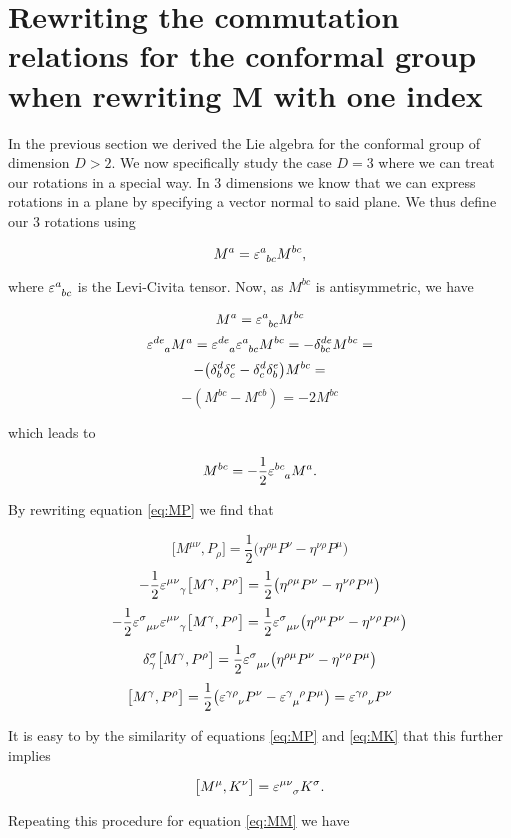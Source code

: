 \section{Rewriting the commutation relations for the conformal group when rewriting M with one index}

In the previous section we derived the Lie algebra for the conformal group of dimension $D>2$. We now specifically study the case $D=3$ where we can treat our rotations in a special way. In 3 dimensions we know that we can express rotations in a plane by specifying a vector normal to said plane. We thus define our 3 rotations using

    $$
    M^a=\ep\ein{a}{bc}M^{bc},
    $$

where $\ep \ein{a}{bc}$ is the Levi-Civita tensor. Now, as $M^{bc}$ is antisymmetric, we have

    $$
    M^a=\ep\ein{a}{bc}M^{bc} 
    $$$$
    \ep \ein{de}{a} M^a=\ep \ein{de}{a} \ep\ein{a}{bc} M^{bc}=-\de^{de}_{bc} M^{bc}=
    $$$$
    -\big( \delta^{d}_{b}\delta^{e}_{c}-\delta^{d}_{c} \delta^{e}_{b} \big) M^{bc}=
    $$$$
    -(M^{bc}-M^{cb})=-2 M^{bc}
    $$
    
which leads to
    
    $$
    M^{bc}=-\frac{1}{2}\ep\ein{bc}{a} M^a.
    $$


By rewriting equation \ref{eq:MP} we find that

    $$
    \big[M^{\mu \nu}, P_\rho \big]= \frac{1}{2} \big( \eta^{\rho \mu}P^\nu-\eta^{\nu \rho}P^\mu \big)
    $$$$
    -\frac{1}{2} \ep \ein{\mu \nu}{\gamma}
    \big[M^{\gamma}, P^\rho \big]=\frac{1}{2}\big( \eta^{\rho \mu}P^\nu-\eta^{\nu \rho}P^\mu \big)
    $$$$
    -\frac{1}{2}\ep \ein{\sigma}{\mu \nu}\ep \ein{\mu \nu}{\gamma}
    \big[M^{\gamma}, P^\rho \big]=\frac{1}{2} \ep \ein{\sigma}{\mu \nu} \big( \eta^{\rho \mu}P^\nu-\eta^{\nu \rho}P^\mu     \big)
    $$$$
    \de^\sigma_\gamma \big[M^{\gamma}, P^\rho \big]=
    \frac{1}{2} \ep \ein{\sigma}{\mu \nu} \big( \eta^{\rho \mu}P^\nu-\eta^{\nu \rho}P^\mu \big)
    $$$$
    \big[M^{\gamma}, P^\rho \big]=\frac{1}{2}  \big( \ep\ein{\gamma \rho}{\nu}P^\nu-\ep\einthree{\gamma}{\mu}{\rho}P^\mu \big)=\ep\ein{\gamma \rho}{\nu}P^\nu
    $$

It is easy to by the similarity of equations \ref{eq:MP} and \ref{eq:MK} that this further implies

    $$
    \big[M^{\mu}, K^\nu \big]=\ep\ein{\mu \nu}{\sigma}K^\sigma.
    $$

Repeating this procedure for equation \ref{eq:MM} we have


